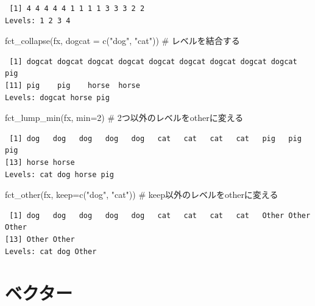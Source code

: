 \documentclass[
  letterpaper,
  DIV=11,
  numbers=noendperiod]{scrreprt}
\newenvironment{Shaded}{\begin{snugshade}}{\end{snugshade}}
\newcommand{\AttributeTok}[1]{\textcolor[rgb]{0.40,0.45,0.13}{#1}}
\newcommand{\CommentTok}[1]{\textcolor[rgb]{0.37,0.37,0.37}{#1}}
\newcommand{\DecValTok}[1]{\textcolor[rgb]{0.68,0.00,0.00}{#1}}
\newcommand{\FunctionTok}[1]{\textcolor[rgb]{0.28,0.35,0.67}{#1}}
\newcommand{\NormalTok}[1]{\textcolor[rgb]{0.00,0.23,0.31}{#1}}
\newcommand{\StringTok}[1]{\textcolor[rgb]{0.13,0.47,0.30}{#1}}
\begin{document}
\begin{verbatim}
 [1] 4 4 4 4 4 1 1 1 1 3 3 3 2 2
Levels: 1 2 3 4
\end{verbatim}

\begin{Shaded}
\begin{Highlighting}[]
\FunctionTok{fct\_collapse}\NormalTok{(fx, }\AttributeTok{dogcat =} \FunctionTok{c}\NormalTok{(}\StringTok{"dog"}\NormalTok{, }\StringTok{"cat"}\NormalTok{)) }\CommentTok{\# レベルを結合する}
\end{Highlighting}
\end{Shaded}

\begin{verbatim}
 [1] dogcat dogcat dogcat dogcat dogcat dogcat dogcat dogcat dogcat pig   
[11] pig    pig    horse  horse 
Levels: dogcat horse pig
\end{verbatim}

\begin{Shaded}
\begin{Highlighting}[]
\FunctionTok{fct\_lump\_min}\NormalTok{(fx, }\AttributeTok{min=}\DecValTok{2}\NormalTok{) }\CommentTok{\# 2つ以外のレベルをotherに変える}
\end{Highlighting}
\end{Shaded}

\begin{verbatim}
 [1] dog   dog   dog   dog   dog   cat   cat   cat   cat   pig   pig   pig  
[13] horse horse
Levels: cat dog horse pig
\end{verbatim}

\begin{Shaded}
\begin{Highlighting}[]
\FunctionTok{fct\_other}\NormalTok{(fx, }\AttributeTok{keep=}\FunctionTok{c}\NormalTok{(}\StringTok{"dog"}\NormalTok{, }\StringTok{"cat"}\NormalTok{)) }\CommentTok{\# keep以外のレベルをotherに変える}
\end{Highlighting}
\end{Shaded}

\begin{verbatim}
 [1] dog   dog   dog   dog   dog   cat   cat   cat   cat   Other Other Other
[13] Other Other
Levels: cat dog Other
\end{verbatim}


\hypertarget{ux30d9ux30afux30bfux30fc}{%
\chapter{ベクター}\label{ux30d9ux30afux30bfux30fc}}
\end{document}

